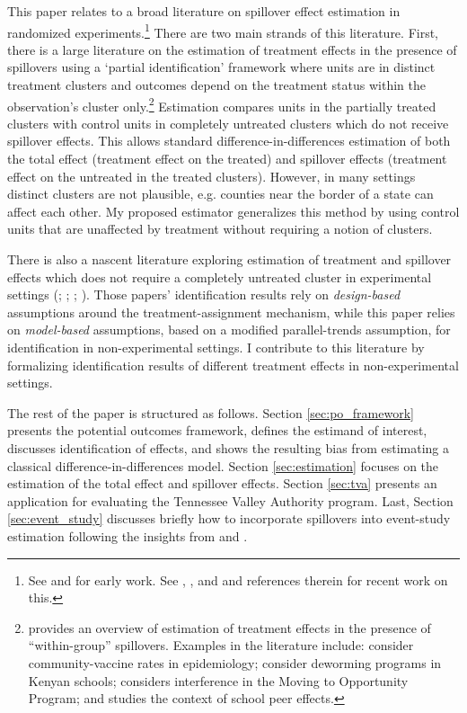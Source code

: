 \documentclass[11pt]{article}
\begin{document}
This paper relates to a broad literature on spillover effect estimation in randomized experiments.\footnote{See \citet{Sobel_2006} and \citet{Hudgens_Halloran_2008} for early work. See \citet{Hu_Li_Wager_2021}, \citet{Savje_Aronow_Hudgens_2021}, and \citet{vazquez2022identification} and references therein for recent work on this.} There are two main strands of this literature. First, there is a large literature on the estimation of treatment effects in the presence of spillovers using a `partial identification' framework where units are in distinct treatment clusters and outcomes depend on the treatment status within the observation's cluster only.\footnote{ \citet{Angelucci_DiMaro_2016} provides an overview of estimation of treatment effects in the presence of ``within-group'' spillovers. Examples in the literature include: \citet{Halloran_Struchiner_1995} consider community-vaccine rates in epidemiology; \citet{Miguel_Kremer_2004} consider deworming programs in Kenyan schools; \citet{Sobel_2006} considers interference in the Moving to Opportunity Program; and \citet{Angrist_2014} studies the context of school peer effects.} Estimation compares units in the partially treated clusters with control units in completely untreated clusters which do not receive spillover effects. This allows standard difference-in-differences estimation of both the total effect (treatment effect on the treated) and spillover effects (treatment effect on the untreated in the treated clusters). However, in many settings distinct clusters are not plausible, e.g. counties near the border of a state can affect each other. My proposed estimator generalizes this method by using control units that are unaffected by treatment without requiring a notion of clusters.

There is also a nascent literature exploring estimation of treatment and spillover effects which does not require a completely untreated cluster in experimental settings (\citet{Savje_Aronow_Hudgens_2021}; \citet{vazquez2022identification}; \citet{Hu_Li_Wager_2021}; \citet{yu2022estimating}). Those papers' identification results rely on \emph{design-based} assumptions around the treatment-assignment mechanism, while this paper relies on \emph{model-based} assumptions, based on a modified parallel-trends assumption, for identification in non-experimental settings. I contribute to this literature by formalizing identification results of different treatment effects in non-experimental settings. 

The rest of the paper is structured as follows. Section \ref{sec:po_framework} presents the potential outcomes framework, defines the estimand of interest, discusses identification of effects, and shows the resulting bias from estimating a classical difference-in-differences model. Section \ref{sec:estimation} focuses on the estimation of the total effect and spillover effects. Section \ref{sec:tva} presents an application for evaluating the Tennessee Valley Authority program. Last, Section \ref{sec:event_study} discusses briefly how to incorporate spillovers into event-study estimation following the insights from \citet{Gardner_2021} and \citet{Borusyak_Jaravel_Spiess_2021}. 
\end{document}
